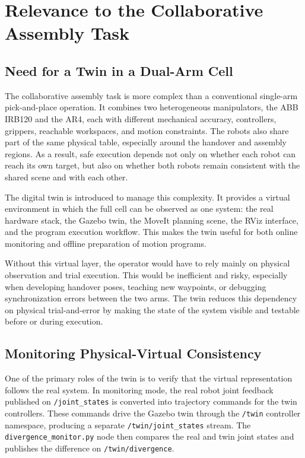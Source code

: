 \section{Relevance to the Collaborative Assembly Task}

\subsection{Need for a Twin in a Dual-Arm Cell}

The collaborative assembly task is more complex than a conventional single-arm pick-and-place operation. It combines two heterogeneous manipulators, the ABB IRB120 and the AR4, each with different mechanical accuracy, controllers, grippers, reachable workspaces, and motion constraints. The robots also share part of the same physical table, especially around the handover and assembly regions. As a result, safe execution depends not only on whether each robot can reach its own target, but also on whether both robots remain consistent with the shared scene and with each other.

The digital twin is introduced to manage this complexity. It provides a virtual environment in which the full cell can be observed as one system: the real hardware stack, the Gazebo twin, the MoveIt planning scene, the RViz interface, and the program execution workflow. This makes the twin useful for both online monitoring and offline preparation of motion programs.

Without this virtual layer, the operator would have to rely mainly on physical observation and trial execution. This would be inefficient and risky, especially when developing handover poses, teaching new waypoints, or debugging synchronization errors between the two arms. The twin reduces this dependency on physical trial-and-error by making the state of the system visible and testable before or during execution.

\subsection{Monitoring Physical-Virtual Consistency}

One of the primary roles of the twin is to verify that the virtual representation follows the real system. In monitoring mode, the real robot joint feedback published on \texttt{/joint\_states} is converted into trajectory commands for the twin controllers. These commands drive the Gazebo twin through the \texttt{/twin} controller namespace, producing a separate \texttt{/twin/joint\_states} stream. The \texttt{divergence\_monitor.py} node then compares the real and twin joint states and publishes the difference on \texttt{/twin/divergence}.

